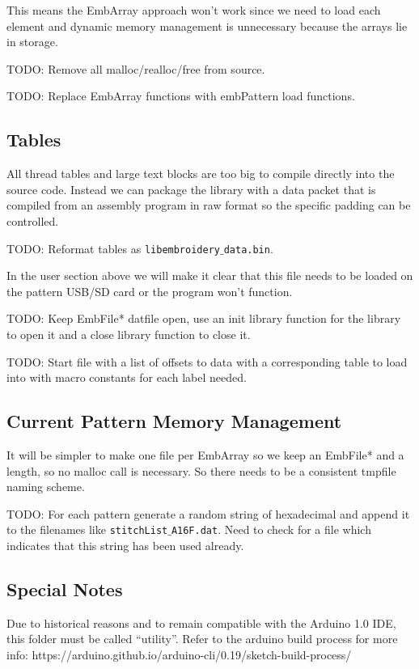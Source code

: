 \documentclass[onesize, a4paper]{refart}
\begin{document}
This means the EmbArray approach won't work since we need to load
each element and dynamic memory management is unnecessary because
the arrays lie in storage.

TODO: Remove all malloc/realloc/free from source.

TODO: Replace EmbArray functions with embPattern load functions.

\subsection{Tables}

All thread tables and large text blocks are too big to compile directly
into the source code. Instead we can package the library with a data packet
that is compiled from an assembly program in raw format so the specific
padding can be controlled.

TODO: Reformat tables as \texttt{libembroidery$\_$data.bin}.

In the user section above we will make it clear that this file
needs to be loaded on the pattern USB/SD card or the program won't function.

TODO: Keep EmbFile* datfile open, use an init library function for the library
to open it and a close library function to close it.

TODO: Start file with a list of offsets to data with a corresponding table
to load into with macro constants for each label needed.

\subsection{Current Pattern Memory Management}

It will be simpler to make one file per EmbArray so we keep an EmbFile*
and a length, so no malloc call is necessary. So there needs to be a consistent
tmpfile naming scheme.

TODO: For each pattern generate a random string of hexadecimal and append it
to the filenames like \texttt{stitchList$\_$A16F.dat}. Need to check for a file
which indicates that this string has been used already.

\subsection{Special Notes}

Due to historical reasons and to remain compatible with the Arduino 1.0
IDE, this folder must be called ``utility''. Refer to the arduino build
process for more info:
https://arduino.github.io/arduino-cli/0.19/sketch-build-process/
\end{document}
